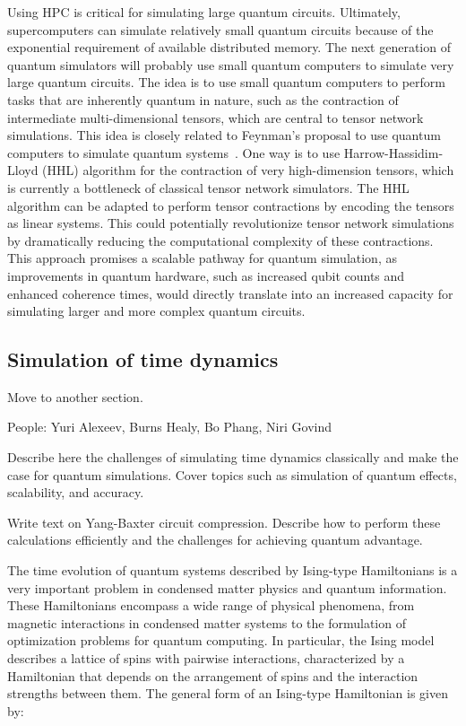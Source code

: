 Using HPC is critical for simulating large quantum circuits. Ultimately, supercomputers can simulate relatively small quantum circuits because of the exponential requirement of available distributed memory. The next generation of quantum simulators will probably use small quantum computers to simulate very large quantum circuits. The idea is to use small quantum computers to perform tasks that are inherently quantum in nature, such as the contraction of intermediate multi-dimensional tensors, which are central to tensor network simulations. This idea is closely related to Feynman's proposal to use quantum computers to simulate quantum systems~\cite{hey2018feynman}. One way is to use Harrow-Hassidim-Lloyd (HHL) algorithm for the contraction of very high-dimension tensors, which is currently a bottleneck of classical tensor network simulators. The HHL algorithm can be adapted to perform tensor contractions by encoding the tensors as linear systems. This could potentially revolutionize tensor network simulations by dramatically reducing the computational complexity of these contractions. This approach promises a scalable pathway for quantum simulation, as improvements in quantum hardware, such as increased qubit counts and enhanced coherence times, would directly translate into an increased capacity for simulating larger and more complex quantum circuits.

\iffalse
\subsection{Simulation of time dynamics} 
Move to another section.

People: Yuri Alexeev, Burns Healy, Bo Phang, Niri Govind

Describe here the challenges of simulating time dynamics classically and make the case for quantum simulations. Cover topics such as simulation of quantum effects, scalability, and accuracy.

Write text on Yang-Baxter circuit compression. Describe how to perform these calculations efficiently and the challenges for achieving quantum advantage.

The time evolution of quantum systems described by Ising-type Hamiltonians is a very important problem in condensed matter physics and quantum information. These Hamiltonians encompass a wide range of physical phenomena, from magnetic interactions in condensed matter systems to the formulation of optimization problems for quantum computing. In particular, the Ising model describes a lattice of spins with pairwise interactions, characterized by a Hamiltonian that depends on the arrangement of spins and the interaction strengths between them. The general form of an Ising-type Hamiltonian is given by:

